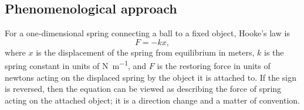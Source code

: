 \documentclass[%
class = book,%
crop = false,%
float = true,%
multi = true,%
preview = false,%
]{standalone}
\begin{document}
\subsection{Phenomenological approach}
\label{ssec:phenomenological-approach}

For a one-dimensional spring connecting a ball to a fixed object, Hooke's law is
\begin{equation}
  \label{eq:hooke_1d}
  F = -k x,
\end{equation}
where \(x\) is the displacement of the spring from equilibrium in meters, \(k\) is the spring constant in units of \si{\newton\per\meter}, and \(F\) is the restoring force in units of newtons acting on the displaced spring by the object it is attached to. If the sign is reversed, then the equation can be viewed as describing the force of spring acting on the attached object; it is a direction change and a matter of convention.
\end{document}
